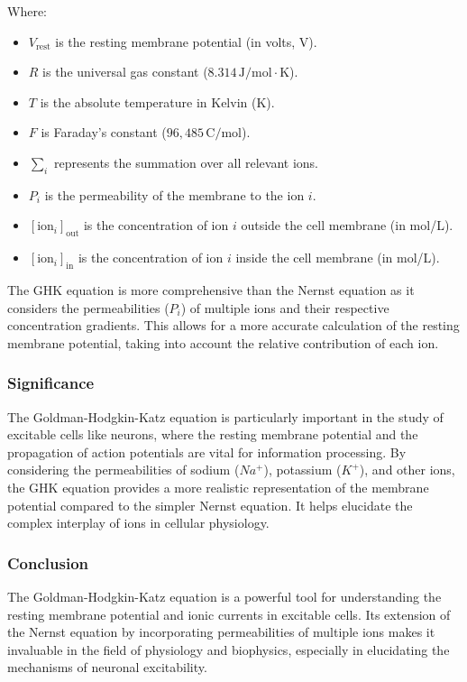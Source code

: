 \documentclass{article}
\begin{document}
Where:
\begin{itemize}
  \item \(V_{\text{rest}}\) is the resting membrane potential (in volts, V).
  \item \(R\) is the universal gas constant (\(8.314 \, \text{J/mol} \cdot \text{K}\)).
  \item \(T\) is the absolute temperature in Kelvin (K).
  \item \(F\) is Faraday's constant (\(96,485 \, \text{C/mol}\)).
  \item \(\sum_i\) represents the summation over all relevant ions.
  \item \(P_i\) is the permeability of the membrane to the ion \(i\).
  \item \([\text{ion}_i]_{\text{out}}\) is the concentration of ion \(i\) outside the cell membrane (in mol/L).
  \item \([\text{ion}_i]_{\text{in}}\) is the concentration of ion \(i\) inside the cell membrane (in mol/L).
\end{itemize}

The GHK equation is more comprehensive than the Nernst equation as it considers the permeabilities (\(P_i\)) of multiple ions and their respective concentration gradients. This allows for a more accurate calculation of the resting membrane potential, taking into account the relative contribution of each ion.

\subsubsection{Significance}

The Goldman-Hodgkin-Katz equation is particularly important in the study of excitable cells like neurons, where the resting membrane potential and the propagation of action potentials are vital for information processing. By considering the permeabilities of sodium (\(Na^+\)), potassium (\(K^+\)), and other ions, the GHK equation provides a more realistic representation of the membrane potential compared to the simpler Nernst equation. It helps elucidate the complex interplay of ions in cellular physiology.

\subsubsection{Conclusion}

The Goldman-Hodgkin-Katz equation is a powerful tool for understanding the resting membrane potential and ionic currents in excitable cells. Its extension of the Nernst equation by incorporating permeabilities of multiple ions makes it invaluable in the field of physiology and biophysics, especially in elucidating the mechanisms of neuronal excitability.
\end{document}
